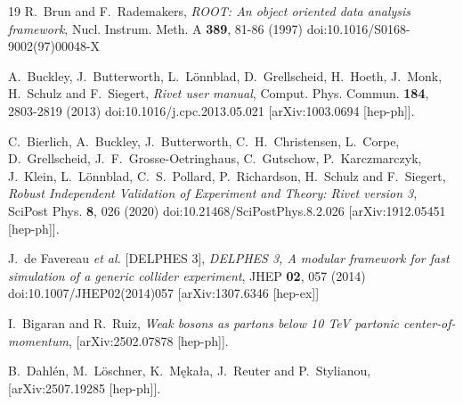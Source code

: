 \documentclass[12pt]{book}
\begin{document}
\begin{thebibliography}{19}
  R.~Brun and F.~Rademakers,
  {\em ROOT: An object oriented data analysis framework},
  Nucl. Instrum. Meth. A \textbf{389}, 81-86 (1997)
  doi:10.1016/S0168-9002(97)00048-X

A.~Buckley, J.~Butterworth, L.~L\"onnblad, D.~Grellscheid, H.~Hoeth, J.~Monk, H.~Schulz and F.~Siegert,
{\em Rivet user manual},
Comput. Phys. Commun. \textbf{184}, 2803-2819 (2013)
doi:10.1016/j.cpc.2013.05.021
[arXiv:1003.0694 [hep-ph]].

C.~Bierlich, A.~Buckley, J.~Butterworth, C.~H.~Christensen, L.~Corpe,
D.~Grellscheid, J.~F.~Grosse-Oetringhaus, C.~Gutschow,
P.~Karczmarczyk, J.~Klein, L.~L\"onnblad, C.~S.~Pollard, P.~Richardson,
H.~Schulz and F.~Siegert,
{\em Robust Independent Validation of Experiment and Theory: Rivet
  version 3},
SciPost Phys. \textbf{8}, 026 (2020)
doi:10.21468/SciPostPhys.8.2.026
[arXiv:1912.05451 [hep-ph]].

J.~de Favereau \textit{et al.} [DELPHES 3],
{\em DELPHES 3, A modular framework for fast simulation of a generic
  collider experiment},
JHEP \textbf{02}, 057 (2014)
doi:10.1007/JHEP02(2014)057
[arXiv:1307.6346 [hep-ex]]

I.~Bigaran and R.~Ruiz,
{\em Weak bosons as partons below 10 TeV partonic center-of-momentum}, 
[arXiv:2502.07878 [hep-ph]].

B.~Dahl{\'e}n, M.~L{\"o}schner, K.~M{\k{e}}ka{\l}a, J.~Reuter and P.~Stylianou,
[arXiv:2507.19285 [hep-ph]].

\end{thebibliography}
\end{document}
